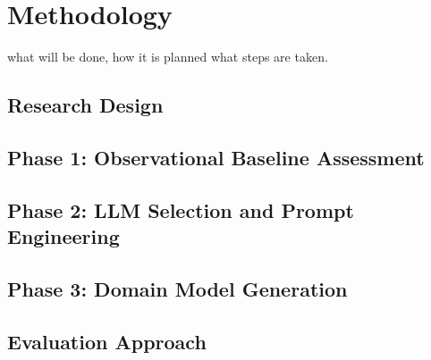 \chapter{Methodology}
what will be done, how it is planned what steps are taken.
\section{Research Design}
\section{Phase 1: Observational Baseline Assessment}
\section{Phase 2: LLM Selection and Prompt Engineering}
\section{Phase 3: Domain Model Generation}
\section{Evaluation Approach}